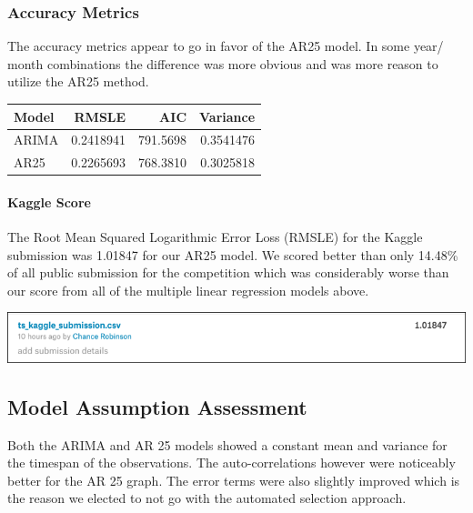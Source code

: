 \documentclass[american,]{article}
\let\oldparagraph\paragraph
\renewcommand{\paragraph}[1]{\oldparagraph{#1}\mbox{}}
\begin{document}
\newpage

\hypertarget{accuracy-metrics}{%
\subsubsection{Accuracy Metrics}\label{accuracy-metrics}}

The accuracy metrics appear to go in favor of the AR25 model. In some year/ month combinations the difference was more obvious and was more reason to utilize the AR25 method.

\begin{table}[H]
\centering
\begin{tabular}{lrrr}
\toprule
Model & RMSLE & AIC & Variance\\
\midrule
ARIMA & 0.2418941 & 791.5698 & 0.3541476\\
AR25 & 0.2265693 & 768.3810 & 0.3025818\\
\bottomrule
\end{tabular}
\end{table}

\newpage

\hypertarget{kaggle-score-2}{%
\paragraph{Kaggle Score}\label{kaggle-score-2}}

The Root Mean Squared Logarithmic Error Loss (RMSLE) for the Kaggle submission was 1.01847 for our AR25 model. We scored better than only 14.48\% of all public submission for the competition which was considerably worse than our score from all of the multiple linear regression models above.

\label{objective-two:ar25-kaggle}

\begin{center}\includegraphics[width=0.9\linewidth]{./images/time_series_ar25} \end{center}

\hypertarget{model-assumption-assessment}{%
\subsection{Model Assumption Assessment}\label{model-assumption-assessment}}

Both the ARIMA and AR 25 models showed a constant mean and variance for the timespan of the observations. The auto-correlations however were noticeably better for the AR 25 graph. The error terms were also slightly improved which is the reason we elected to not go with the automated selection approach.
\end{document}
